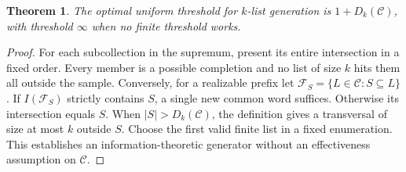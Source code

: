 \documentclass[11pt]{article}
\newtheorem{theorem}{Theorem}
\newcommand{\C}{\mathcal C}
\newcommand{\F}{\mathcal F}
\begin{document}
\begin{theorem}\label{crit}
The optimal uniform threshold for $k$-list generation is $1+D_k(\C)$, with threshold $\infty$ when no finite threshold works.
\end{theorem}
\begin{proof}
For each subcollection in the supremum, present its entire intersection in a fixed order. Every member is a possible completion and no list of size $k$ hits them all outside the sample. Conversely, for a realizable prefix let $\F_S=\{L\in\C:S\subseteq L\}$. If $I(\F_S)$ strictly contains $S$, a single new common word suffices. Otherwise its intersection equals $S$. When $|S|>D_k(\C)$, the definition gives a transversal of size at most $k$ outside $S$. Choose the first valid finite list in a fixed enumeration. This establishes an information-theoretic generator without an effectiveness assumption on $\C$.
\end{proof}
\end{document}
